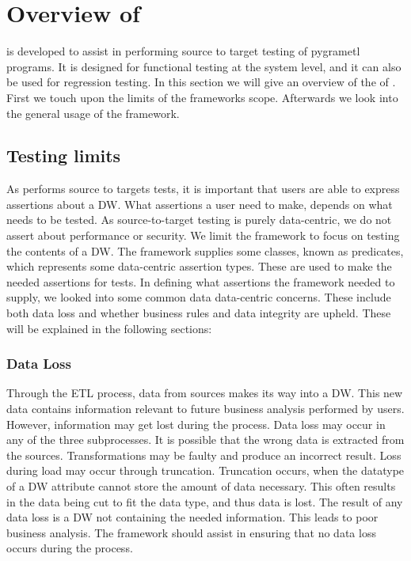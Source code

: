 \section{Overview of \FW{}}
\FW{} is developed to assist in performing source to target testing of pygrametl programs. It is designed for functional testing at the system level, and it can also be used for regression testing.  In this section we will give an overview of the of \FW{}. First we touch upon the limits of the frameworks scope.  Afterwards we look into the general usage of the framework.

\subsection{Testing limits}
As \FW{} performs source to targets tests, it is important that users are able to express assertions about a DW. What assertions a user need to make, depends on what needs to be tested. As source-to-target testing is purely data-centric, we do not assert about  performance or security. We limit the framework to focus on testing the contents of a DW. The framework supplies some classes, known as predicates, which represents some data-centric assertion types. These are used to make the needed assertions for tests. In defining what assertions the framework needed to supply, we looked into some common data data-centric concerns. These include both data loss and whether business rules and data integrity are upheld.  These will be explained in the following sections: 

\subsubsection{Data Loss}
Through the ETL process, data from sources makes its way into a DW. This new data contains information relevant to future business analysis performed by users. However, information may get lost during the process. Data loss may occur in any of the three subprocesses. It is possible that the wrong data is extracted from the sources. Transformations may be faulty and produce an incorrect result. Loss during load may occur through truncation. Truncation occurs, when the datatype of a DW attribute cannot store the amount of data necessary. This often results in the data being cut to fit the data type, and thus data is lost. The result of any data loss is a DW not containing the needed information. This leads to poor business analysis. The framework should assist in ensuring that no data loss occurs during the process.

